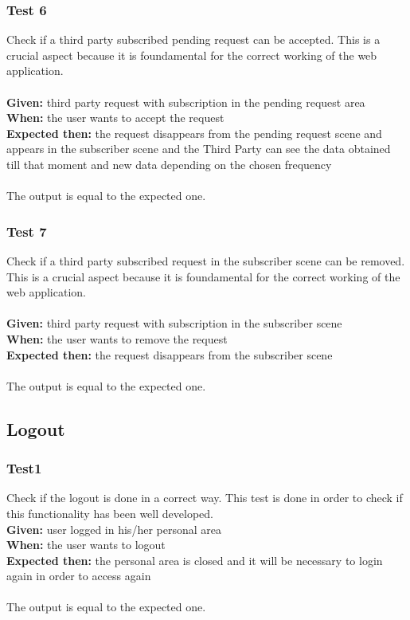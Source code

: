 \subsubsection{\Large{Test 6}}
Check if a third party subscribed pending request can be accepted. This is a crucial aspect because it is foundamental for the correct working of the web application.\\
\\
\textbf{Given: }  third party request with subscription in the pending request area\\
\textbf{When: } the user wants to accept the request\\
\textbf{Expected then: } the request disappears from the pending request scene and appears in the subscriber scene and the Third Party can see the data obtained till that moment and new data depending on the chosen frequency \\
\\
The output is equal to the expected one.

\subsubsection{\Large{Test 7}}
Check if a third party subscribed request in the subscriber scene can be removed. This is a crucial aspect because it is foundamental for the correct working of the web application.\\
\\
\textbf{Given: }  third party request with subscription in the subscriber scene\\
\textbf{When: } the user wants to remove the request\\
\textbf{Expected then: } the request disappears from the subscriber scene \\
\\
The output is equal to the expected one.

\subsection{Logout}

\subsubsection{\Large{Test1}}
Check if the logout is done in a correct way. This test is done in order to check if this functionality has been well developed.
\\
\textbf{Given: }  user logged in his/her personal area\\
\textbf{When: } the user wants to logout\\
\textbf{Expected then: } the personal area is closed and it will be necessary to login again in order to access again \\
\\
The output is equal to the expected one.